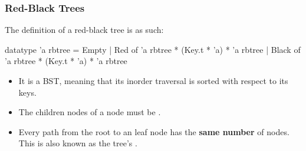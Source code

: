 \documentclass[aspectratio=169]{beamer}
\begin{document}
\begin{frame}[fragile]
  \frametitle{Red-Black Trees}

  The definition of a red-black tree is as such:

  \begin{codeblock}
    datatype 'a rbtree =
        Empty
      | Red of 'a rbtree * (Key.t * 'a) * 'a rbtree
      | Black of 'a rbtree * (Key.t * 'a) * 'a rbtree
  \end{codeblock}

  \pause
  \vspace{\fill}


  \pause
  \vspace{\fill}

  \begin{itemize}
    \item It is a BST, meaning that its inorder traversal is sorted with
    respect to its keys. \pause
    \item The children nodes of a  node must be . \pause
    \item Every path from the root to an  leaf node has the
    \textbf{same number} of  nodes. This is also known as the
    tree's .
  \end{itemize}
\end{frame}
\end{document}
